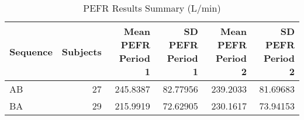 \begin{table}
\centering
\caption{PEFR Results Summary (L/min)}
\centering
\begin{tabular}[t]{l|r|r|r|r|r}
\hline
Sequence & Subjects & Mean PEFR Period 1 & SD PEFR Period 1 & Mean PEFR Period 2 & SD PEFR Period 2\\
\hline
AB & 27 & 245.8387 & 82.77956 & 239.2033 & 81.69683\\
\hline
BA & 29 & 215.9919 & 72.62905 & 230.1617 & 73.94153\\
\hline
\end{tabular}
\end{table}
